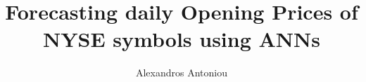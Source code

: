 \author{Alexandros Antoniou}
\title{\bfseries Forecasting daily Opening Prices of NYSE symbols using ANNs}
